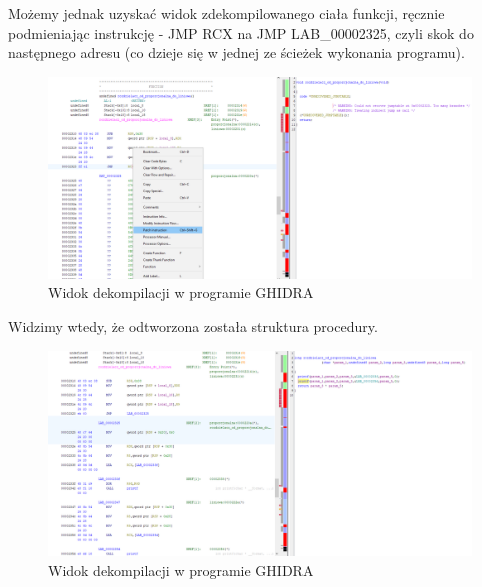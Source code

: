 Możemy jednak uzyskać widok zdekompilowanego ciała funkcji, ręcznie podmieniając instrukcję - JMP RCX na JMP LAB\_00002325, czyli skok do następnego adresu (co dzieje się w jednej ze ścieżek wykonania programu). 
\FloatBarrier
\begin{figure}[H]
    \centering
    \includegraphics[width=1.2\textwidth]{images/2.rozdzielacz/3.png}
    \caption{Widok dekompilacji w programie GHIDRA}
\end{figure}
Widzimy wtedy, że odtworzona została struktura procedury.
\begin{figure}[H]
    \centering
    \includegraphics[width=1.2\textwidth]{images/2.rozdzielacz/4.png}
    \caption{Widok dekompilacji w programie GHIDRA}
\end{figure}

